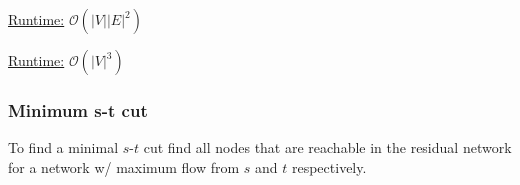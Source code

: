 \underline{Runtime:} $\mathcal{O}(\lvert V \rvert \lvert E \rvert^2)$

\underline{Runtime:} $\mathcal{O}(\left| V \right|^3)$

\subsubsection{Minimum s-t cut}

To find a minimal $s$-$t$ cut find all nodes that are reachable in the
residual network for a network w/ maximum flow from $s$ and $t$
respectively.


